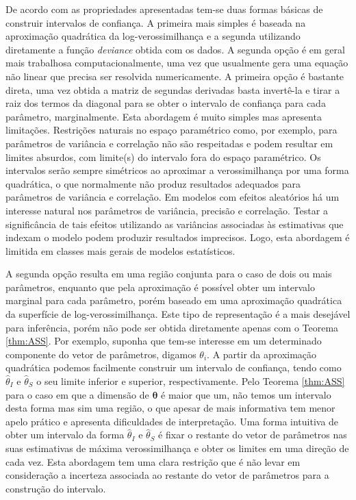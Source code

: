 \documentclass[
  9pt,
  a5paper,
]{book}
\theoremstyle{definition}
\theoremstyle{definition}
\theoremstyle{definition}
\theoremstyle{definition}
\theoremstyle{remark}
\begin{document}
De acordo com as propriedades apresentadas tem-se duas formas básicas de construir intervalos de confiança. A primeira mais simples é baseada na aproximação quadrática da log-verossimilhança e a segunda utilizando diretamente a função \emph{deviance} obtida com os dados. A segunda opção é em geral mais trabalhosa computacionalmente, uma vez que usualmente gera uma equação não linear que precisa ser resolvida numericamente.
A primeira opção é bastante direta, uma vez obtida a matriz de segundas derivadas basta invertê-la e tirar a raiz dos termos da diagonal para se obter o intervalo de confiança para cada parâmetro, marginalmente. Esta abordagem é muito simples mas apresenta limitações. Restrições naturais no espaço paramétrico como, por exemplo,
para parâmetros de variância e correlação não são respeitadas e podem resultar em limites absurdos, com limite(s) do intervalo fora do espaço paramétrico. Os intervalos serão sempre simétricos ao aproximar a verossimilhança por uma forma quadrática, o que normalmente não produz resultados adequados para parâmetros de variância e correlação.
Em modelos com efeitos aleatórios há um interesse natural nos parâmetros de variância, precisão e correlação. Testar a significância de tais efeitos utilizando as variâncias associadas às estimativas que indexam o modelo podem produzir resultados imprecisos.
Logo, esta abordagem é limitida em classes mais gerais de modelos estatísticos.

A segunda opção resulta em uma região conjunta para o caso de dois ou mais parâmetros,
enquanto que pela aproximação é possível obter um intervalo marginal para cada parâmetro,
porém baseado em uma aproximação quadrática da superfície de log-verossimilhança.
Este tipo de representação é a mais desejável para inferência,
porém não pode ser obtida diretamente apenas com o Teorema \ref{thm:ASS}.
Por exemplo, suponha que tem-se interesse em um determinado componente do vetor de parâmetros, digamos \(\theta_i\). A partir da aproximação quadrática podemos facilmente construir um intervalo de confiança, tendo como \(\hat{\theta}_I\) e \(\hat{\theta}_S\) o seu limite inferior e superior, respectivamente. Pelo Teorema \ref{thm:ASS} para o caso em que a dimensão de \(\boldsymbol{\theta}\) é maior que um, não temos um intervalo desta forma mas sim uma região, o que apesar de mais informativa tem menor apelo prático e apresenta dificuldades de interpretação. Uma forma intuitiva de obter um intervalo da forma \(\hat{\theta}_I\) e \(\hat{\theta}_S\) é fixar o restante do vetor de parâmetros nas suas estimativas de máxima verossimilhança e obter os limites em uma direção de cada vez.
Esta abordagem tem uma clara restrição que é não levar em consideração a incerteza associada ao restante do vetor de parâmetros para a construção do intervalo.
\end{document}
